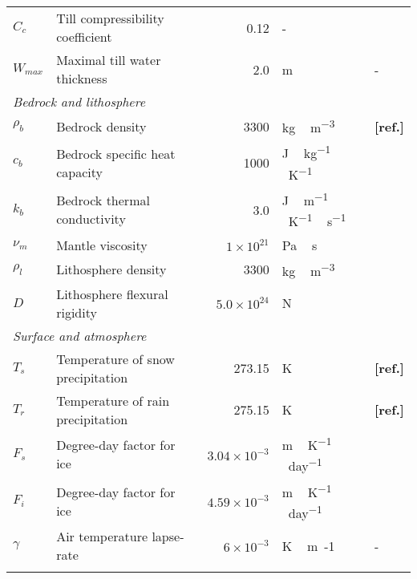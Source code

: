 \documentclass[tc, manuscript]{copernicus}
\newcommand{\aref}[0]{\textbf{[ref.]}}
\begin{document}
\begin{table*}
{\begin{tabular}{llrll}
    $C_c$   & Till compressibility coefficient
            & 0.12
            & -
            & \citet{Tulaczyk.etal.2000} \\

    $W_{max}$ & Maximal till water thickness
            & 2.0
            & m
            & - \\

    \multicolumn{2}{l}{\emph{Bedrock and lithosphere}} \\

    $\rho_b$& Bedrock density
            & 3300
            & \unit{kg\,m^{-3}}
            & \aref \\

    $c_b$   & Bedrock specific heat capacity
            & 1000
            & \unit{J\,kg^{-1}\,K^{-1}}
            & \citet{Ritz.1997} \\

    $k_b$   & Bedrock thermal conductivity
            & 3.0
            & \unit{J\,m^{-1}\,K^{-1}\,s^{-1}}
            & \citet{Ritz.1997} \\

    $\nu_m$ & Mantle viscosity
            & $1\times10^21$
            & \unit{Pa\,s}
            & \citet{Lingle.Clark.1985} \\

    $\rho_l$& Lithosphere density
            & 3300
            & \unit{kg\,m^{-3}}
            & \citet{Lingle.Clark.1985} \\

    $D$     & Lithosphere flexural rigidity
            & $5.0\times10^24$
            & \unit{N}
            & \citet{Lingle.Clark.1985} \\

    \multicolumn{2}{l}{\emph{Surface and atmosphere}} \\

    $T_s$   & Temperature of snow precipitation
            & 273.15
            & \unit{K}
            & \aref \\

    $T_r$   & Temperature of rain precipitation
            & 275.15
            & \unit{K}
            & \aref \\

    $F_s$   & Degree-day factor for ice
            & $3.04\times10^{-3}$
            & \unit{m\,K^{-1}\,day^{-1}}
            & \citet{Shea.etal.2009} \\

    $F_i$   & Degree-day factor for ice
            & $4.59\times10^{-3}$
            & \unit{m\,K^{-1}\,day^{-1}}
            & \citet{Shea.etal.2009} \\

    $\gamma$& Air temperature lapse-rate
            & $6\times10^{-3}$
            & \unit{K\,m{-1}}
            & - \\

    \bottomhline
  \end{tabular}}
  \belowtable{}
\end{table*}
\end{document}
